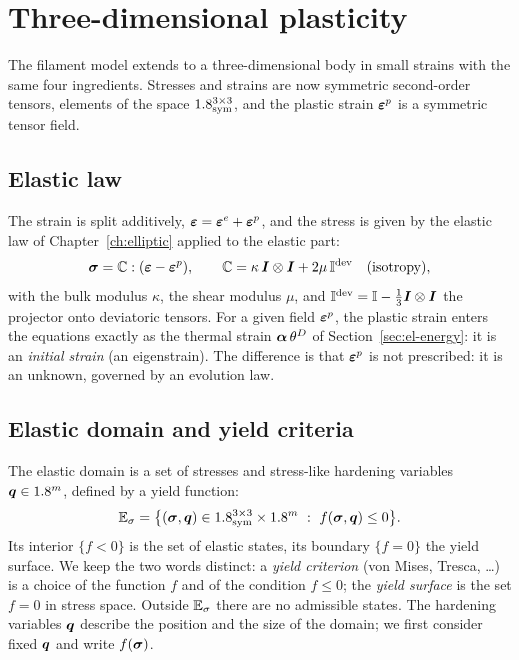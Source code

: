 \section{Three-dimensional plasticity}\label{sec:pl-3d}
%
The filament model extends to a three-dimensional body in small strains with
the same four ingredients. Stresses and strains are now symmetric
second-order tensors, elements of the space $1.8^{3\times3}_{\mathrm{sym}}$, and the plastic strain
$\bm{\varepsilon}^{p}$ is a symmetric tensor field.

\subsection{Elastic law}\label{ssec:pl-elastic}
%
The strain is split additively, $\bm{\varepsilon}=\bm{\varepsilon}^{e}+\bm{\varepsilon}^{p}$, and the stress is given by
the elastic law of Chapter~\ref{ch:elliptic} applied to the elastic part:
\begin{equation}\label{eq:pl-elastic}
  \bm{\sigma}=\mathbb{C}:(\bm{\varepsilon}-\bm{\varepsilon}^{p}),\qquad
  \mathbb{C}=\kappa\,\bm{I}\otimes\bm{I}+2\mu\,\mathbb{I}^{\mathrm{dev}}\quad\text{(isotropy)},
\end{equation}
with the bulk modulus $\kappa$, the shear modulus $\mu$, and
$\mathbb{I}^{\mathrm{dev}}=\mathbb{I}-\tfrac13\bm{I}\otimes\bm{I}$ the projector onto deviatoric tensors.
For a given field $\bm{\varepsilon}^{p}$, the plastic strain enters the equations exactly as
the thermal strain $\bm{\alpha}\,\theta^D$ of Section~\ref{sec:el-energy}: it is an
\emph{initial strain} (an eigenstrain). The difference is that $\bm{\varepsilon}^{p}$ is not
prescribed: it is an unknown, governed by an evolution law.

\subsection{Elastic domain and yield criteria}\label{ssec:pl-criteria}
%
The elastic domain is a set of stresses and stress-like hardening variables
$\bm{q}\in1.8^m$, defined by a yield function:
\begin{equation}\label{eq:pl-domain}
  \Esig=\bigl\{(\sig,\vq)\in\Sym\times\R^m\ :\ f(\sig,\vq)\le0\bigr\}.
\end{equation}
Its interior $\{f<0\}$ is the set of elastic states, its boundary $\{f=0\}$
the yield surface. We keep the two words distinct: a \emph{yield criterion}
(von Mises, Tresca, \ldots) is a choice of the function $f$ and of the
condition $f\le0$; the \emph{yield surface} is the set $f=0$ in stress space.
Outside $\mathbb{E}_{\sigma}$ there are no admissible states. The
hardening variables $\bm{q}$ describe the position and the size of the domain;
we first consider fixed $\bm{q}$ and write $f(\bm{\sigma})$.

